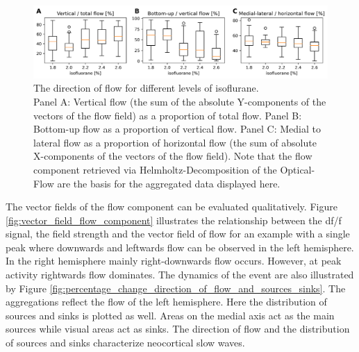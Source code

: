\begin{figure}[!htb]
\centering
\includegraphics[width=\textwidth,height=\textheight,keepaspectratio]{Figures/direction_per_isoflourane}
\decoRule
\caption[Direction of flow for different levels of isoflurane]{The direction of flow for different levels of isoflurane.\\Panel A: Vertical flow (the sum of the absolute Y-components of the vectors of the flow field) as a proportion of total flow. Panel B: Bottom-up flow as a proportion of vertical flow. Panel C: Medial to lateral flow as a proportion of horizontal flow (the sum of absolute X-components of the vectors of the flow field). Note that the flow component retrieved via Helmholtz-Decomposition of the Optical-Flow are the basis for the aggregated data displayed here.}
\label{fig:direction_per_isoflourane}
\end{figure}
The vector fields of the flow component can be evaluated qualitatively. Figure \ref{fig:vector_field_flow_component} illustrates the relationship between the df/f signal, the field strength and the vector field of flow for an example with a single peak where downwards and leftwards flow can be observed in the left hemisphere. In the right hemisphere mainly right-downwards flow occurs. However, at peak activity rightwards flow dominates. The dynamics of the event are also illustrated by Figure \ref{fig:percentage_change_direction_of_flow_and_sources_sinks}. The aggregations reflect the flow of the left hemisphere. Here the distribution of sources and sinks is plotted as well. Areas on the medial axis act as the main sources while visual areas act as sinks. The direction of flow and the distribution of sources and sinks characterize neocortical slow waves.\\
